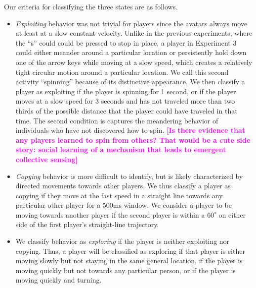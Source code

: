 \documentclass[12pt,letterpaper]{article}
\newcommand{\andrew}[1]{\textcolor{magenta}{\bf [#1]}}
\begin{document}
Our criteria for classifying the three states are as follows.
\begin{itemize}
\item \emph{Exploiting} behavior was not trivial for players since the avatars always move at least at a slow constant velocity. 
Unlike in the previous experiments, where the ``s'' could could be pressed to stop in place, a player in Experiment 3 could either meander around a particular location or persistently hold down one of the arrow keys while moving at a slow speed, which creates a relatively tight circular motion around a particular location.  
We call this second activity ``spinning'' because of its distinctive appearance.  
We then classify a player as exploiting if the player is spinning for 1 second, or if the player moves at a slow speed for 3 seconds and has not traveled more than two thirds of the possible distance that the player could have traveled in that time.
The second condition is captures the meandering behavior of individuals who have not discovered how to spin. \andrew{Is there evidence that any players learned to spin from others? That would be a cute side story: social learning of a mechanism that leads to emergent collective sensing} 
\item \emph{Copying} behavior is more difficult to identify, but is likely characterized by directed movements towards other players. 
We thus classify a player as copying if they move at the fast speed in a straight line towards any particular other player for a 500ms window.
We consider a player to be moving towards another player if the second player is within a $60^\circ$ on either side of the first player's straight-line trajectory.
\item We classify behavior as \emph{exploring} if the player is neither exploiting nor copying. Thus, a player will be classified as exploring if that player is either moving slowly but not staying in the same general location, if the player is moving quickly but not towards any particular person, or if the player is moving quickly and turning.
\end{itemize}
\end{document}
